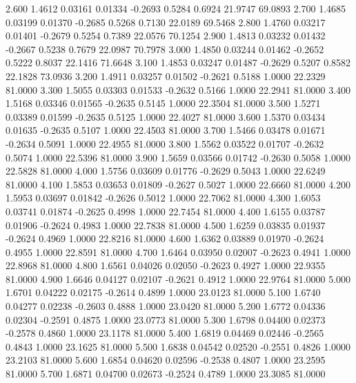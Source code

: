    2.600   1.4612   0.03161   0.01334  -0.2693   0.5284   0.6924  21.9747  69.0893
   2.700   1.4685   0.03199   0.01370  -0.2685   0.5268   0.7130  22.0189  69.5468
   2.800   1.4760   0.03217   0.01401  -0.2679   0.5254   0.7389  22.0576  70.1254
   2.900   1.4813   0.03232   0.01432  -0.2667   0.5238   0.7679  22.0987  70.7978
   3.000   1.4850   0.03244   0.01462  -0.2652   0.5222   0.8037  22.1416  71.6648
   3.100   1.4853   0.03247   0.01487  -0.2629   0.5207   0.8582  22.1828  73.0936
   3.200   1.4911   0.03257   0.01502  -0.2621   0.5188   1.0000  22.2329  81.0000
   3.300   1.5055   0.03303   0.01533  -0.2632   0.5166   1.0000  22.2941  81.0000
   3.400   1.5168   0.03346   0.01565  -0.2635   0.5145   1.0000  22.3504  81.0000
   3.500   1.5271   0.03389   0.01599  -0.2635   0.5125   1.0000  22.4027  81.0000
   3.600   1.5370   0.03434   0.01635  -0.2635   0.5107   1.0000  22.4503  81.0000
   3.700   1.5466   0.03478   0.01671  -0.2634   0.5091   1.0000  22.4955  81.0000
   3.800   1.5562   0.03522   0.01707  -0.2632   0.5074   1.0000  22.5396  81.0000
   3.900   1.5659   0.03566   0.01742  -0.2630   0.5058   1.0000  22.5828  81.0000
   4.000   1.5756   0.03609   0.01776  -0.2629   0.5043   1.0000  22.6249  81.0000
   4.100   1.5853   0.03653   0.01809  -0.2627   0.5027   1.0000  22.6660  81.0000
   4.200   1.5953   0.03697   0.01842  -0.2626   0.5012   1.0000  22.7062  81.0000
   4.300   1.6053   0.03741   0.01874  -0.2625   0.4998   1.0000  22.7454  81.0000
   4.400   1.6155   0.03787   0.01906  -0.2624   0.4983   1.0000  22.7838  81.0000
   4.500   1.6259   0.03835   0.01937  -0.2624   0.4969   1.0000  22.8216  81.0000
   4.600   1.6362   0.03889   0.01970  -0.2624   0.4955   1.0000  22.8591  81.0000
   4.700   1.6464   0.03950   0.02007  -0.2623   0.4941   1.0000  22.8968  81.0000
   4.800   1.6561   0.04026   0.02050  -0.2623   0.4927   1.0000  22.9355  81.0000
   4.900   1.6646   0.04127   0.02107  -0.2621   0.4912   1.0000  22.9764  81.0000
   5.000   1.6701   0.04222   0.02175  -0.2614   0.4899   1.0000  23.0123  81.0000
   5.100   1.6740   0.04277   0.02238  -0.2603   0.4888   1.0000  23.0420  81.0000
   5.200   1.6772   0.04336   0.02304  -0.2591   0.4875   1.0000  23.0773  81.0000
   5.300   1.6798   0.04400   0.02373  -0.2578   0.4860   1.0000  23.1178  81.0000
   5.400   1.6819   0.04469   0.02446  -0.2565   0.4843   1.0000  23.1625  81.0000
   5.500   1.6838   0.04542   0.02520  -0.2551   0.4826   1.0000  23.2103  81.0000
   5.600   1.6854   0.04620   0.02596  -0.2538   0.4807   1.0000  23.2595  81.0000
   5.700   1.6871   0.04700   0.02673  -0.2524   0.4789   1.0000  23.3085  81.0000
